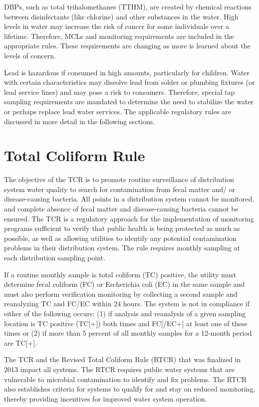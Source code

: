 \documentclass[10pt]{article}
\begin{document}
DBPs, such as total trihalomethanes (TTHM), are created by chemical reactions between disinfectants (like chlorine) and other substances in the water. High levels in water may increase the risk of cancer for some individuals over a lifetime. Therefore, MCLs and monitoring requirements are included in the appropriate rules. These requirements are changing as more is learned about the levels of concern.

Lead is hazardous if consumed in high amounts, particularly for children. Water with certain characteristics may dissolve lead from solder or plumbing fixtures (or lead service lines) and may pose a risk to consumers. Therefore, special tap sampling requirements are mandated to determine the need to stabilize the water or perhaps replace lead water services. The applicable regulatory rules are discussed in more detail in the following sections.

\section{Total Coliform Rule}
The objective of the TCR is to promote routine surveillance of distribution system water quality to search for contamination from fecal matter and/ or disease-causing bacteria. All points in a distribution system cannot be monitored, and complete absence of fecal matter and disease-causing bacteria cannot be ensured. The TCR is a regulatory approach for the implementation of monitoring programs sufficient to verify that public health is being protected as much as possible, as well as allowing utilities to identify any potential contamination problems in their distribution system. The rule requires monthly sampling at each distribution sampling point.

If a routine monthly sample is total coliform (TC) positive, the utility must determine fecal coliform (FC) or Escherichia coli (EC) in the same sample and must also perform verification monitoring by collecting a second sample and reanalyzing TC and FC/EC within 24 hours. The system is not in compliance if either of the following occurs: (1) if analysis and reanalysis of a given sampling location is TC positive (TC[+]) both times and FC[/EC+] at least one of these times or (2) if more than 5 percent of all monthly samples for a 12-month period are TC[+].

The TCR and the Revised Total Coliform Rule (RTCR) that was finalized in 2013 impact all systems. The RTCR requires public water systems that are vulnerable to microbial contamination to identify and fix problems. The RTCR also establishes criteria for systems to qualify for and stay on reduced monitoring, thereby providing incentives for improved water system operation.
\end{document}
